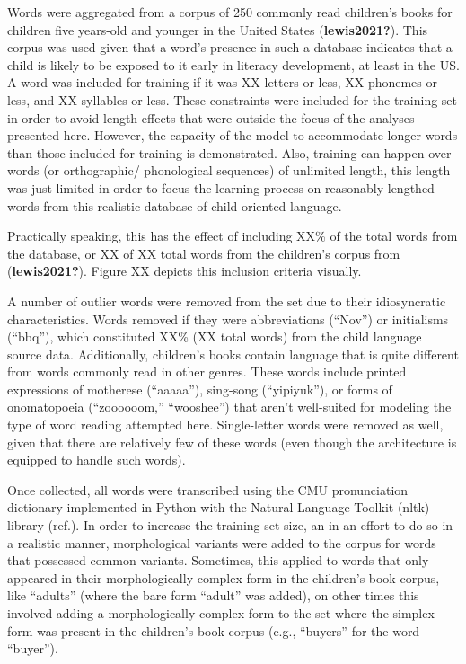 \documentclass[
  american,
  ,man,floatsintext]{apa6}
\begin{document}
Words were aggregated from a corpus of 250 commonly read children's books for children five years-old and younger in the United States (\textbf{lewis2021?}). This corpus was used given that a word's presence in such a database indicates that a child is likely to be exposed to it early in literacy development, at least in the US. A word was included for training if it was XX letters or less, XX phonemes or less, and XX syllables or less. These constraints were included for the training set in order to avoid length effects that were outside the focus of the analyses presented here. However, the capacity of the model to accommodate longer words than those included for training is demonstrated. Also, training can happen over words (or orthographic/ phonological sequences) of unlimited length, this length was just limited in order to focus the learning process on reasonably lengthed words from this realistic database of child-oriented language.

Practically speaking, this has the effect of including XX\% of the total words from the database, or XX of XX total words from the children's corpus from (\textbf{lewis2021?}). Figure XX depicts this inclusion criteria visually.

A number of outlier words were removed from the set due to their idiosyncratic characteristics. Words removed if they were abbreviations (``Nov'') or initialisms (``bbq''), which constituted XX\% (XX total words) from the child language source data. Additionally, children's books contain language that is quite different from words commonly read in other genres. These words include printed expressions of motherese (``aaaaa''), sing-song (``yipiyuk''), or forms of onomatopoeia (``zoooooom,'' ``wooshee'') that aren't well-suited for modeling the type of word reading attempted here. Single-letter words were removed as well, given that there are relatively few of these words (even though the architecture is equipped to handle such words).

Once collected, all words were transcribed using the CMU pronunciation dictionary implemented in Python with the Natural Language Toolkit (nltk) library (ref.). In order to increase the training set size, an in an effort to do so in a realistic manner, morphological variants were added to the corpus for words that possessed common variants. Sometimes, this applied to words that only appeared in their morphologically complex form in the children's book corpus, like ``adults'' (where the bare form ``adult'' was added), on other times this involved adding a morphologically complex form to the set where the simplex form was present in the children's book corpus (e.g., ``buyers'' for the word ``buyer'').
\end{document}
